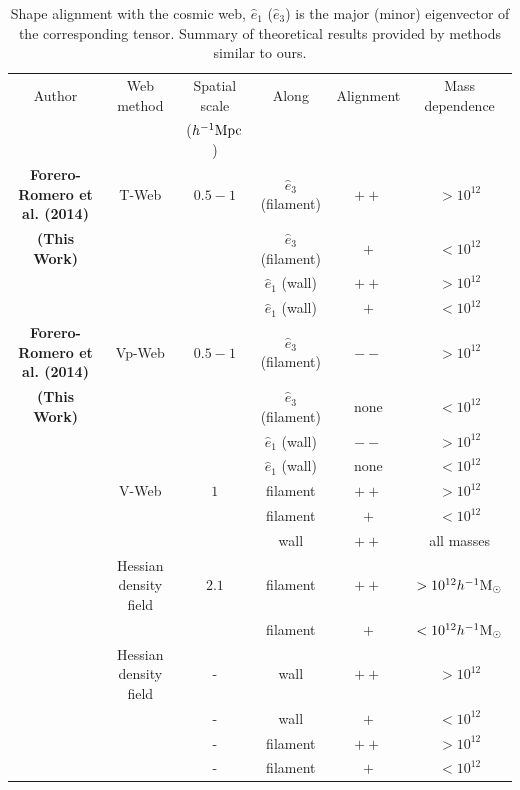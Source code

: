 \documentclass[useAMS,usenatbib]{mn2e}
\newcommand{\hMpc}{{\ifmmode{h^{-1}{\rm Mpc}}\else{$h^{-1}$Mpc }\fi}}
\newcommand{\hMsun}{{\ifmmode{h^{-1}{\rm
        {M_{\odot}}}}\else{$h^{-1}{\rm{M_{\odot}}}$~}\fi}}
\begin{document}
\begin{table}
\begin{tabular}{cccccc}\hline\hline
Author & Web method & Spatial scale & Along &
Alignment & Mass dependence\\
 & & ($\hMpc$)& & & \\\hline

{\bf Forero-Romero et al. (2014)} & T-Web & $0.5-1$ &
$\hat{e}_3$ (filament) &$++$ & $>10^{12}$\hMsun\\
{\bf (This Work)}&   & &
$\hat{e}_3$ (filament) & $+$ & $<10^{12}$\hMsun\\

&   & &
$\hat{e}_1$ (wall) & $++$ & $>10^{12}$\hMsun\\

&   & &
$\hat{e}_1$ (wall) & $+$ & $<10^{12}$\hMsun\\\hline

{\bf Forero-Romero et al. (2014)} & Vp-Web & $0.5-1$ &
$\hat{e}_3$ (filament) &$--$ & $>10^{12}$\hMsun\\
{\bf (This Work)}&   & &
$\hat{e}_3$ (filament) & none & $<10^{12}$\hMsun\\
&   & &
$\hat{e}_1$ (wall) & $--$ & $>10^{12}$\hMsun\\

&   & &
$\hat{e}_1$ (wall) & none & $<10^{12}$\hMsun\\\hline


\cite{Libeskind2013} & V-Web & $1$ &
filament &$++$ & $>10^{12}$\hMsun\\
&   & &
filament &$+$ & $<10^{12}$\hMsun\\
&   & &
wall & $++$ & all masses\\\hline

\cite{Zhang2009}  & Hessian density field &  $2.1$ &
filament & $++$ & $>10^{12}\hMsun$\\

& &  &
filament & $+$ & $<10^{12}\hMsun$\\\hline

\cite{AragonCalvo2007} & Hessian density field & - &
wall & $++$ & $>10^{12}$\hMsun\\

& & - &
wall & $+$ & $<10^{12}$\hMsun\\

& & - &
filament& $++$ & $>10^{12}$\hMsun\\

& & - &
filament& $+$ & $<10^{12}$\hMsun\\\hline \hline

\end{tabular}\\
\caption{Shape alignment with the cosmic web, 
$\hat{e}_1$ ($\hat{e}_3$)
is the major (minor) eigenvector of
the corresponding tensor. 
Summary of theoretical
  results provided by methods similar to ours.}
\end{table}
\end{document}
